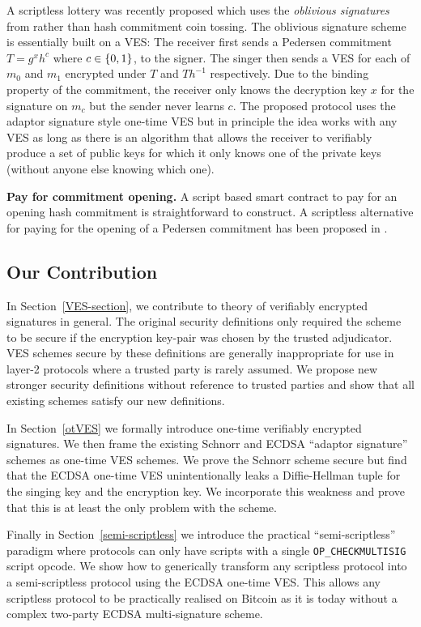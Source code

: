 \documentclass[fullpage]{article}
\theoremstyle{definition}
\begin{document}
A scriptless lottery was recently proposed\cite{fournier_lottery} which uses the \emph{oblivious signatures} from \cite{1-of-n-oblivious-signatures} rather than hash commitment coin tossing. The oblivious signature scheme is essentially built on a VES: The receiver first sends a Pedersen commitment $T = g^xh^c$ where $c \in \{0,1\}$, to the signer. The singer then sends a VES for each of $m_0$ and $m_1$ encrypted under $T$ and $Th^{-1}$ respectively. Due to the binding property of the commitment, the receiver only knows the decryption key $x$ for the signature on $m_c$ but the sender never learns $c$. The proposed protocol uses the adaptor signature style one-time VES but in principle the idea works with any VES as long as there is an algorithm that allows the receiver to verifiably produce a set of public keys for which it only knows one of the private keys (without anyone else knowing which one).

\hfill \break  \textbf{Pay for commitment opening.} A script based smart contract to pay for an opening hash commitment is straightforward to construct. A scriptless alternative for paying for the opening of a Pedersen commitment has been proposed in \cite{pay-for-pedersen}.

\subsection{Our Contribution}

In Section~\ref{VES-section}, we contribute to theory of verifiably encrypted signatures in general. The original security definitions\cite{Boneh:2003:AVE:1766171.1766207} only required the scheme to be secure if the encryption key-pair was chosen by the trusted adjudicator. VES schemes secure by these definitions are generally inappropriate for use in layer-2 protocols where a  trusted party is rarely assumed. We propose new stronger security definitions without reference to trusted parties and show that all existing schemes satisfy our new definitions.

In Section~\ref{otVES} we formally introduce one-time verifiably encrypted signatures. We then frame the existing Schnorr and ECDSA ``adaptor signature'' schemes as one-time VES schemes. We prove the Schnorr scheme secure but find that the ECDSA one-time VES unintentionally leaks a Diffie-Hellman tuple for the singing key and the encryption key. We incorporate this weakness and prove that this is at least the only problem with the scheme.

Finally in Section~\ref{semi-scriptless} we introduce the practical ``semi-scriptless'' paradigm where protocols can only have scripts with a single \texttt{OP\_CHECKMULTISIG} script opcode. We show how to generically transform any scriptless protocol into a semi-scriptless protocol using the ECDSA one-time VES\@. This allows any scriptless protocol to be practically realised on Bitcoin as it is today without a complex two-party ECDSA multi-signature scheme.
\end{document}

